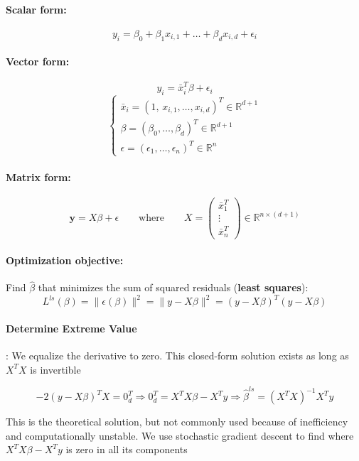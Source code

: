 \documentclass{article}
\begin{document}
\paragraph{Scalar form:}
\[
  y_i = \beta_0 + \beta_1 x_{i,1} + \dots + \beta_d x_{i,d} + \epsilon_i
\]

\paragraph{Vector form:}
\[
  y_i = \bar{x}_i^T \beta + \epsilon_i
\]
\[
\begin{cases}
  \bar{x}_i = (1,\, x_{i,1},\dots, x_{i,d})^T \in \mathbb{R}^{d+1} \\
  \beta      = (\beta_0,\dots,\beta_d)^T       \in \mathbb{R}^{d+1} \\
  \epsilon   = (\epsilon_1,\dots,\epsilon_n)^T \in \mathbb{R}^{n}
\end{cases}
\]

\paragraph{Matrix form:}
\[
  \mathbf{y} = X\beta + \epsilon
  \qquad\text{where}\qquad
  X =
  \begin{pmatrix}
    \bar{x}_1^T \\
    \vdots \\
    \bar{x}_n^T
  \end{pmatrix}
  \in \mathbb{R}^{n\times(d+1)}
\]

\paragraph{Optimization objective:}
Find $\hat{\beta}$ that minimizes the sum of squared residuals (\textbf{least squares}):
\[
  L^{ls}(\beta)
  = \|\epsilon(\beta)\|^2
  = \|y - X\beta\|^2
  = (y - X\beta)^T(y - X\beta)
\]

\paragraph{Determine Extreme Value}: We equalize the derivative to zero. This closed-form solution exists as long as $X^TX$ is invertible

\[-2(y-X\beta)^TX = 0^T_d \Rightarrow 0^T_d = X^TX\beta - X^Ty \Rightarrow \hat{\beta}^{ls} = (X^TX)^{-1}X^Ty\]

This is the theoretical solution, but not commonly used because of inefficiency and computationally unstable. We use stochastic gradient descent to find where $X^TX\beta - X^T y$ is zero in all its components
\end{document}
